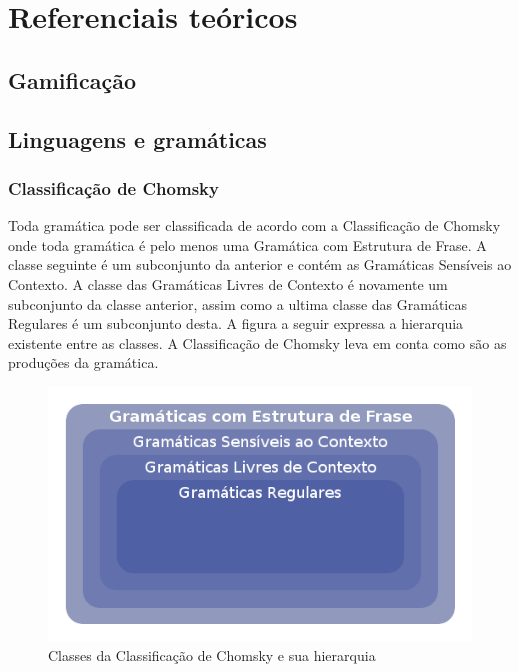 \part{Referenciais teóricos}

\chapter{Gamificação}

\chapter{Linguagens e gramáticas}

\section{Classificação de Chomsky}
Toda gramática pode ser classificada de acordo com a Classificação de Chomsky onde toda gramática é pelo menos uma Gramática com Estrutura de Frase. A classe seguinte é um subconjunto da anterior e contém as Gramáticas Sensíveis ao Contexto. A classe das Gramáticas Livres de Contexto é novamente um subconjunto da classe anterior, assim como a ultima classe das Gramáticas Regulares é um subconjunto desta. A figura a seguir expressa a hierarquia existente entre as classes. A Classificação de Chomsky leva em conta como são as produções da gramática.

	
\begin{figure}[H]
	\caption{\label{gram_cls}Classes da Classificação de Chomsky e sua hierarquia}
	\begin{center}
	    \includegraphics[scale=0.5]{driagrama_classes_gramaticas.png}
	\end{center}
\end{figure}

